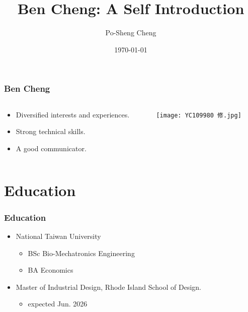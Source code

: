 \documentclass[compress, aspectratio=32]{beamer}
\title{Ben Cheng: A Self Introduction}
\author{Po-Sheng Cheng}
\institute{RISD MID}
\date{\today}
\begin{document}
\begin{frame}
    \titlepage
\end{frame}


\begin{frame}
    \frametitle{Ben Cheng}
    \begin{columns}
        \begin{column}{0.5\linewidth}
            \begin{itemize}
                \item Diversified interests and experiences.
                \item Strong technical skills.
                \item A good communicator.
            \end{itemize}
        \end{column}
        \begin{column}{0.5\linewidth}
            \texttt{[image: YC109980 修.jpg]}
        \end{column}
    \end{columns}
\end{frame}

\section{Education}
\begin{frame}
    \frametitle{Education}
    \begin{itemize}
        \item National Taiwan University
    \begin{itemize}
        \item BSc Bio-Mechatronics Engineering
        \item BA Economics
    \end{itemize}
    \item Master of Industrial Design, Rhode Island School of Design. \begin{itemize}
        \item expected Jun. 2026
    \end{itemize} 
    \end{itemize}
    
    
\end{frame}
\end{document}
